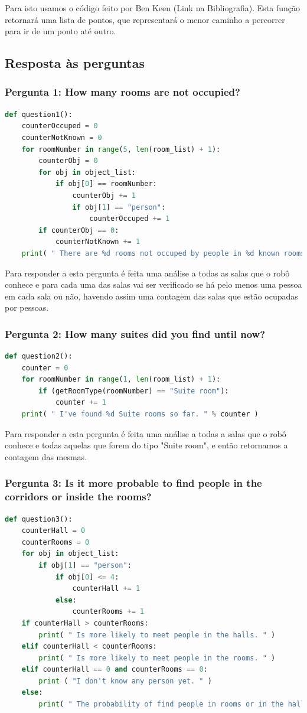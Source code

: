 \documentclass{article}
\begin{document}
Para isto usamos o código feito por Ben Keen (Link na Bibliografia). Esta função retornará uma lista de pontos, que representará o menor caminho a percorrer para ir de um ponto até outro.

\newpage
\subsection{Resposta às perguntas}

\subsubsection{Pergunta 1: How many rooms are not occupied?}
\begin{lstlisting}[language=Python]
  def question1():
	counterOccuped = 0
	counterNotKnown = 0
	for roomNumber in range(5, len(room_list) + 1):
		counterObj = 0
		for obj in object_list:
			if obj[0] == roomNumber:
				counterObj += 1
				if obj[1] == "person":
					counterOccuped += 1
		if counterObj == 0:
			counterNotKnown += 1
	print( " There are %d rooms not occuped by people in %d known rooms. " % (((10 - counterNotKnown) - counterOccuped), (10 - counterNotKnown)) ) 
\end{lstlisting}

Para responder a esta pergunta é feita uma análise a todas as salas que o robô conhece e para cada uma das salas vai ser verificado se há pelo menos uma pessoa em cada sala ou não, havendo assim uma contagem das salas que estão ocupadas por pessoas.

\subsubsection{Pergunta 2: How many suites did you find until now?}
\begin{lstlisting}[language=Python]
  def question2():
	counter = 0
	for roomNumber in range(1, len(room_list) + 1):
		if (getRoomType(roomNumber) == "Suite room"):
			counter += 1
	print( " I've found %d Suite rooms so far. " % counter )
\end{lstlisting}

Para responder a esta pergunta é feita uma análise a todas a salas que o robô conhece e todas aquelas que forem do tipo "Suite room", e então retornamos a contagem das mesmas.

\subsubsection{Pergunta 3: Is it more probable to find people in the corridors or inside the rooms?}
\begin{lstlisting}[language=Python]
  def question3():
	counterHall = 0
	counterRooms = 0
	for obj in object_list:
		if obj[1] == "person":
			if obj[0] <= 4:
				counterHall += 1
			else:
				counterRooms += 1
	if counterHall > counterRooms:
		print( " Is more likely to meet people in the halls. " )
	elif counterHall < counterRooms:
		print( " Is more likely to meet people in the rooms. " )
	elif counterHall == 0 and counterRooms == 0:
		print ( "I don't know any person yet. " )
	else:
		print( " The probability of find people in rooms or in the halls is equal. " )
\end{lstlisting}
\end{document}
